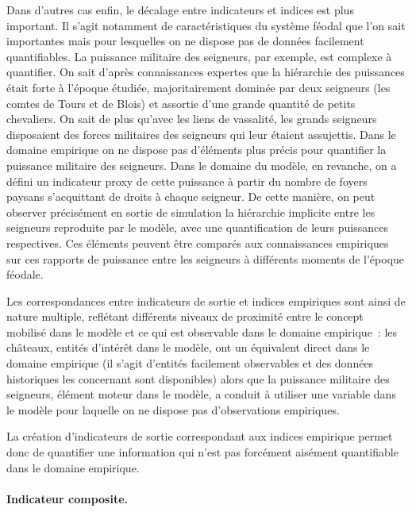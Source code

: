 Dans d’autres cas enfin, le décalage entre indicateurs et indices est plus important.
Il s’agit notamment de caractéristiques du système féodal que l’on sait importantes mais pour lesquelles on ne dispose pas de données facilement quantifiables.
La puissance militaire des seigneurs, par exemple, est complexe à quantifier.
On sait d’après connaissances expertes que la hiérarchie des puissances était forte à l’époque étudiée, majoritairement dominée par deux seigneurs (les comtes de Tours et de Blois) et assortie d’une grande quantité de petits chevaliers.
On sait de plus qu’avec les liens de vassalité, les grands seigneurs disposaient des forces militaires des seigneurs qui leur étaient assujettis.
Dans le domaine empirique on ne dispose pas d’éléments plus précis pour quantifier la puissance militaire des seigneurs.
Dans le domaine du modèle, en revanche, on a défini un indicateur \og proxy\fg{} de cette puissance à partir du nombre de foyers paysans s’acquittant de droits à chaque seigneur.
De cette manière, on peut observer précisément en sortie de simulation la hiérarchie implicite entre les seigneurs reproduite par le modèle, avec une quantification de leurs puissances respectives.
Ces éléments peuvent être comparés aux connaissances empiriques sur ces rapports de puissance entre les seigneurs à différents moments de l'époque féodale.

Les correspondances entre indicateurs de sortie et indices empiriques sont ainsi de nature multiple, reflétant différents niveaux de proximité entre le concept mobilisé dans le modèle et ce qui est observable dans le domaine empirique :
les châteaux, entités d’intérêt dans le modèle, ont un équivalent direct dans le domaine empirique (il s’agit d’entités facilement observables et des données historiques les concernant sont disponibles) alors que la puissance militaire des seigneurs, élément moteur dans le modèle, a conduit à utiliser une variable dans le modèle pour laquelle on ne dispose pas d’observations empiriques.

La création d'indicateurs de sortie correspondant aux indices empirique permet donc de quantifier une information qui n'est pas forcément aisément quantifiable dans le domaine empirique.

\paragraph{Indicateur composite.}

